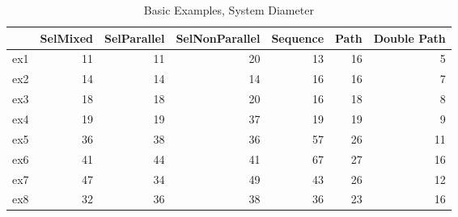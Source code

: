 \begin{table}
\centering
\caption{Basic Examples, System Diameter}
\label{b_e_diam}
\begin{tabular}{lrrrrrr}
\toprule
{} &  SelMixed &  SelParallel &  SelNonParallel &  Sequence &  Path &  Double Path \\
\midrule
ex1 &        11 &           11 &              20 &        13 &    16 &            5 \\
ex2 &        14 &           14 &              14 &        16 &    16 &            7 \\
ex3 &        18 &           18 &              20 &        16 &    18 &            8 \\
ex4 &        19 &           19 &              37 &        19 &    19 &            9 \\
ex5 &        36 &           38 &              36 &        57 &    26 &           11 \\
ex6 &        41 &           44 &              41 &        67 &    27 &           16 \\
ex7 &        47 &           34 &              49 &        43 &    26 &           12 \\
ex8 &        32 &           36 &              38 &        36 &    23 &           16 \\
\bottomrule
\end{tabular}
\end{table}
